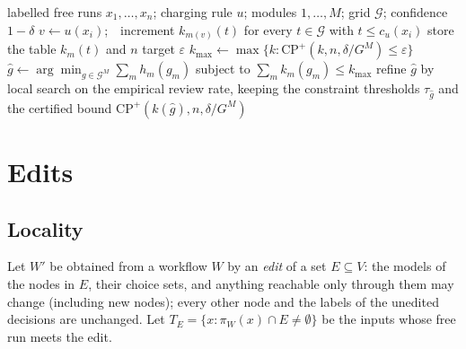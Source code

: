 \documentclass[11pt]{article}
\theoremstyle{definition}
\theoremstyle{remark}
\newcommand{\CP}{\mathrm{CP}^{+}}
\newcommand{\eps}{\varepsilon}
\begin{document}
\begin{algorithm}[t]
\caption{Certify a workflow and choose thresholds}\label{alg:certify}
\begin{algorithmic}[1]
\Require labelled free runs $x_1,\dots,x_n$; charging rule $u$; modules $1,\dots,M$; grid
$\mathcal G$; confidence $1-\delta$
 
  \State $v\gets u(x_i)$;\ \ increment $k_{m(v)}(t)$ for every $t\in\mathcal G$ with $t\le c_u(x_i)$
\EndFor
\State store the table $k_m(t)$ and $n$ 
\Statex
\Require target $\eps$ 
\State $k_{\max}\gets\max\{k:\CP(k,n,\delta/G^M)\le\eps\}$
\State $\hat g\gets\arg\min_{g\in\mathcal G^M}\sum_m h_m(g_m)$ subject to $\sum_m k_m(g_m)\le k_{\max}$
\State refine $\hat g$ by local search on the empirical review rate, keeping the constraint
\State \Return thresholds $\tau_{\hat g}$ and the certified bound $\CP(k(\hat g),n,\delta/G^M)$
\end{algorithmic}
\end{algorithm}

\section{Edits}\label{sec:edits}

\subsection{Locality}

Let $W'$ be obtained from a workflow $W$ by an \emph{edit} of a set $E\subseteq V$: the models
of the nodes in $E$, their choice sets, and anything reachable only through them may change
(including new nodes); every other node and the labels of the unedited decisions are unchanged.
Let $T_E=\{x:\pi_W(x)\cap E\ne\emptyset\}$ be the inputs whose free run meets the edit.
\end{document}
